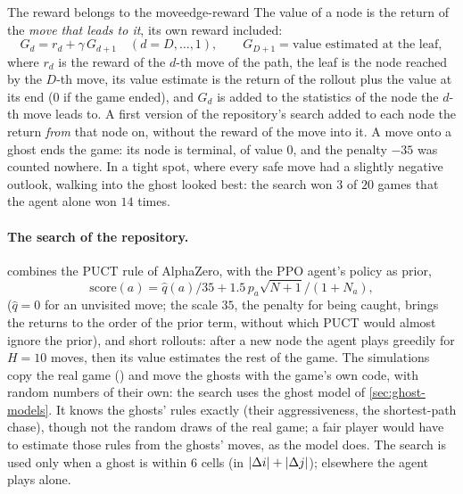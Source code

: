 \begin{remark}{The reward belongs to the move}{edge-reward}
  The value of a node is the return of the \emph{move that leads to it},
  its own reward included:
  \begin{equation}
    G_d = r_d + \gamma\, G_{d+1} \quad (d = D, \dots, 1), \qquad
    G_{D+1} = \text{value estimated at the leaf},
  \end{equation}
  where $r_d$ is the reward of the $d$-th move of the path, the leaf is the
  node reached by the $D$-th move, its value estimate is the return of the
  rollout plus the value at its end ($0$ if the game ended), and $G_d$ is
  added to the statistics of the node the $d$-th move leads to. A first
  version of the repository's search added to each node the return
  \emph{from} that node on, without the reward of the move into it. A move
  onto a ghost ends the game: its node is terminal, of value $0$, and the
  penalty $-35$ was counted nowhere. In a tight spot, where every safe move
  had a slightly negative outlook, walking into the ghost looked best: the
  search won $3$ of $20$ games that the agent alone won $14$ times.
\end{remark}

\paragraph{The search of the repository.}  combines
the PUCT rule of AlphaZero, with the PPO agent's policy as prior,
\begin{equation*}
  \mathrm{score}(a) = \hat q(a) / 35 + 1.5\, p_a \sqrt{N + 1} / (1 + N_a),
\end{equation*}
($\hat q = 0$ for an unvisited move; the scale $35$, the penalty for being
caught, brings the returns to the order of the prior term, without which
PUCT would almost ignore the prior), and short rollouts: after a new node the
agent plays greedily for $H = 10$ moves, then its value estimates the rest of
the game. The simulations copy the real game
() and move the ghosts with the game's own code, with
random numbers of their own: the search uses the  ghost model
of \cref{sec:ghost-models}. It knows the ghosts' rules exactly (their
aggressiveness, the shortest-path chase), though not the random draws of
the real game; a fair player would have to estimate those rules from the
ghosts' moves, as the  model does. The search is used only
when a ghost is within $6$ cells (in $\left\lvert \Delta i \right\rvert + \left\lvert \Delta j \right\rvert$);
elsewhere the agent plays alone.

